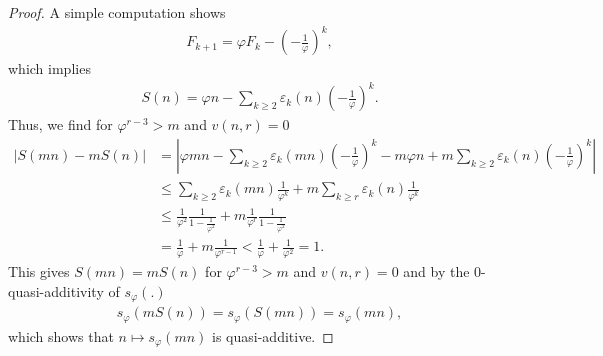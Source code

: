 \documentclass[12pt]{amsart}
\begin{document}
\begin{proof}
A simple computation shows
\begin{align*}
  F_{k+1} = \varphi F_k - {\left( {-\frac{1}{\varphi}} \right)}^{k},
\end{align*}
which implies
\begin{align*}
  S(n) = \varphi n - \sum_{k\geq 2} \varepsilon_k(n) {\left( {-\frac{1}{\varphi}} \right)}^{k}.
\end{align*}
Thus, we find for $\varphi^{r-3} >m$ and $v(n,r) = 0$
\begin{align*}
  {\left| {S(mn) - m S(n)} \right|} &= {\left| {\varphi m n - \sum_{k\geq 2}\varepsilon_k(mn) {\left( {-\frac{1}{\varphi}} \right)}^k - m \varphi n + m \sum_{k\geq 2}\varepsilon_k(n) {\left( {-\frac{1}{\varphi}} \right)}^k} \right|}\\
    &\leq \sum_{k\geq 2} \varepsilon_k(mn) \frac{1}{\varphi^k} + m \sum_{k\geq r} \varepsilon_k(n) \frac{1}{\varphi^k}\\
    &\leq \frac{1}{\varphi^2} \frac{1}{1-\frac{1}{\varphi^2}} + m \frac{1}{\varphi^r} \frac{1}{1-\frac{1}{\varphi^2}}\\
    &= \frac{1}{\varphi} + m \frac{1}{\varphi^{r-1}} < \frac{1}{\varphi} + \frac{1}{\varphi^2} = 1.
\end{align*}
This gives $S(mn) = m S(n)$ for $\varphi^{r-3} > m$ and $v(n,r) = 0$ and by the $0$-quasi-additivity of $s_{\varphi}(.)$ 
\begin{align*}
  s_{\varphi}(m S(n)) = s_{\varphi}(S(mn)) = s_{\varphi}(mn),
\end{align*}
which shows that $n \mapsto s_{\varphi}(mn)$ is quasi-additive.
\end{proof}
\end{document}
